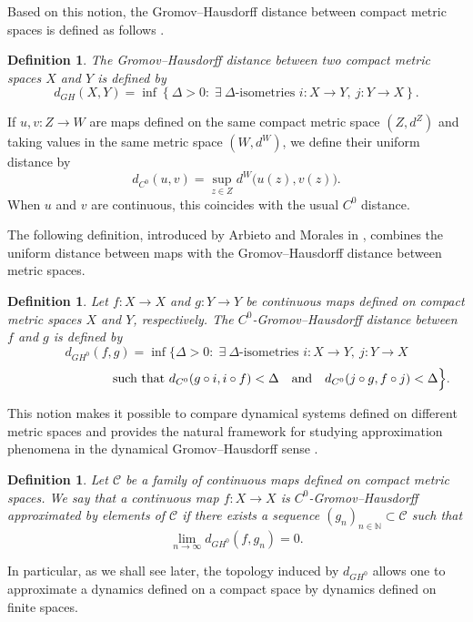 \documentclass{amsart}
\numberwithin{equation}{section}
\newtheorem{definition}[theorem]{Definition}
\theoremstyle{remark}
\begin{document}
Based on this notion, the Gromov--Hausdorff distance between compact metric spaces is defined as follows \cite{gromov2007,burago2001}.

\begin{definition}
The Gromov--Hausdorff distance between two compact metric spaces $X$ and $Y$ is defined by
\[
d_{GH}(X,Y)
=
\inf\left\{
\Delta>0:\; \exists\ \Delta\text{-isometries } i:X\to Y,\ j:Y\to X
\right\}.
\]
\end{definition}

If $u,v:Z\to W$ are maps defined on the same compact metric space $(Z,d^Z)$ and taking values in the same metric space $(W,d^W)$, we define their uniform distance by
\[
d_{C^0}(u,v)=\sup_{z\in Z} d^W\bigl(u(z),v(z)\bigr).
\]
When $u$ and $v$ are continuous, this coincides with the usual $C^0$ distance.

The following definition, introduced by Arbieto and Morales in \cite{arbieto2017topological}, combines the uniform distance between maps with the Gromov--Hausdorff distance between metric spaces.

\begin{definition}
Let $f:X\to X$ and $g:Y\to Y$ be continuous maps defined on compact metric spaces $X$ and $Y$, respectively. The $C^0$-Gromov--Hausdorff distance between $f$ and $g$ is defined by
\[
d_{GH^0}(f,g)
=
\inf\Big\{
\Delta>0:\; \exists\ \Delta\text{-isometries } i:X\to Y,\ j:Y\to X
\]
\[
\hspace{2.4cm}\text{ such that }
d_{C^0}(g\circ i,i\circ f)<\Delta
\quad\text{and}\quad
d_{C^0}(j\circ g,f\circ j)<\Delta
\Big\}.
\]
\end{definition}

This notion makes it possible to compare dynamical systems defined on different metric spaces and provides the natural framework for studying approximation phenomena in the dynamical Gromov--Hausdorff sense \cite{arbieto2017topological,lee2022gromov}.

\begin{definition}
Let $\mathcal C$ be a family of continuous maps defined on compact metric spaces. We say that a continuous map $f:X\to X$ is \emph{$C^0$-Gromov--Hausdorff approximated} by elements of $\mathcal C$ if there exists a sequence $(g_n)_{n\in\mathbb N}\subset \mathcal C$ such that
\[
\lim_{n\to\infty}d_{GH^0}(f,g_n)=0.
\]
\end{definition}

In particular, as we shall see later, the topology induced by $d_{GH^0}$ allows one to approximate a dynamics defined on a compact space by dynamics defined on finite spaces.
\end{document}
